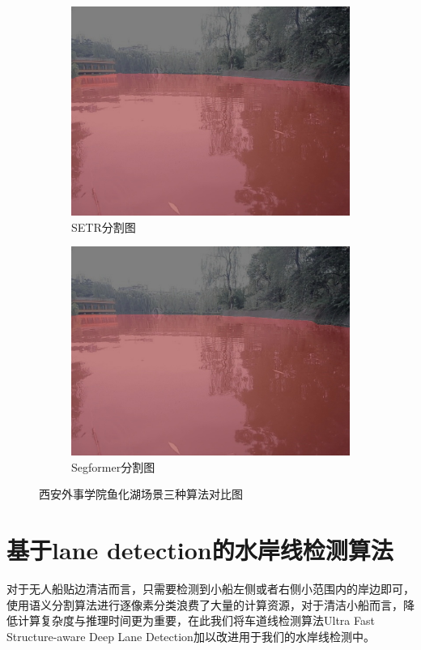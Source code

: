 \documentclass[cn,12pt,color=mine,scheme=chinese,bibstyle=gb7714-2015]{elegantbook}
\begin{document}
\begin{figure}[h]
\begin{subfigure}[b]{0.23\linewidth}
		\centering\includegraphics[width=\linewidth]{results2/test6setr}\caption{\label{fig:setr}SETR分割图}
	\end{subfigure}
	\begin{subfigure}[b]{0.23\linewidth}
		\centering\includegraphics[width=\linewidth]{results2/test6segformer}\caption{\label{fig:segformer}Segformer分割图}
	\end{subfigure}
	\caption{\label{test2}西安外事学院鱼化湖场景三种算法对比图}
\end{figure}


\section{基于lane detection的水岸线检测算法}
对于无人船贴边清洁而言，只需要检测到小船左侧或者右侧小范围内的岸边即可，使用语义分割算法进行逐像素分类浪费了大量的计算资源，对于清洁小船而言，降低计算复杂度与推理时间更为重要，在此我们将车道线检测算法Ultra Fast Structure-aware Deep Lane Detection\cite{qin2020ultra}加以改进用于我们的水岸线检测中。
\end{document}
